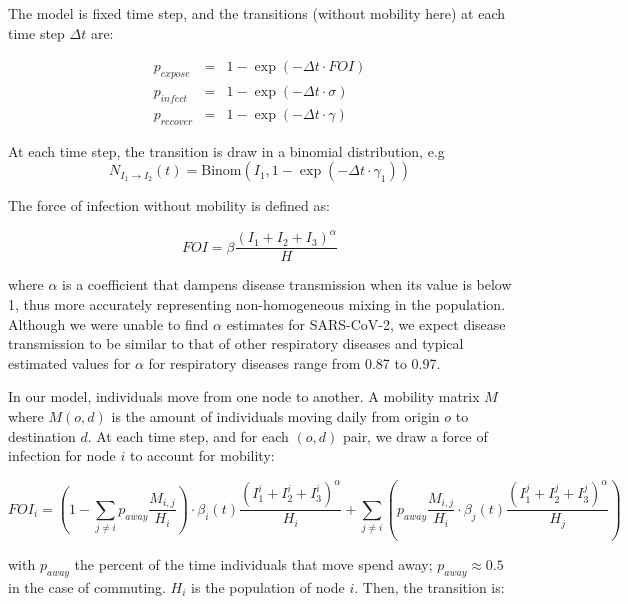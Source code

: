 The model is fixed time step, and the transitions (without mobility here) at each time step
$\Delta t$ are: 

\begin{eqnarray}
p_{expose} &=&  1 - \exp(-\Delta t \cdot FOI) \\
p_{infect} &=& 1 - \exp(-\Delta t \cdot \sigma)\\
p_{recover} &=& 1 - \exp(-\Delta t \cdot \gamma)
\end{eqnarray}

At each time step, the transition is draw in a binomial distribution, e.g 
\begin{equation}
N_{I_1\longrightarrow I_2}(t) = \text{Binom}(I_1, 1 - \exp(-\Delta t \cdot \gamma_1))
\end{equation}

The force of infection without mobility is defined as: 

\begin{equation}
FOI = \beta \frac{(I_1 + I_2 + I_3)^\alpha}{H} 
\end{equation}

where $\alpha$ is a coefficient that dampens disease transmission when its value is below 1, thus more accurately representing non-homogeneous mixing in the population. Although we were unable to find $\alpha$ estimates for SARS-CoV-2, we expect disease transmission to be similar to that of other respiratory diseases and typical estimated values for $\alpha$ for respiratory diseases range from 0.87 to 0.97.

In our model, individuals move from one node to another. A mobility matrix $M$ where
$M(o,d)$ is the amount of individuals moving daily from origin $o$ to
destination $d$. At each time step, and for each $(o,d)$ pair, we draw a force of infection 
for node $i$ to account for mobility:
\begin{fullwidth}
	
\begin{equation}
FOI_i = \left(1 - \sum_{j\neq i} p_{away} \frac{M_{i,j}}{H_i} \right) \cdot \beta_i(t) \frac{(I_1^{i} + I_2^{i} + I_3^{i})^\alpha}{H_i} +  \sum_{j \neq i} \left(p_{away} \frac{M_{i,j}}{H_i} \cdot \beta_j(t) \frac{(I_1^j + I_2^j + I_3^j)^\alpha}{H_j} \right)
\end{equation}
\end{fullwidth}

with $p_{away}$ the percent of the time individuals that move spend away; $p_{away} \approx 0.5$ in the case of commuting. $H_i$ is the population of node $i$. Then, the transition is:

